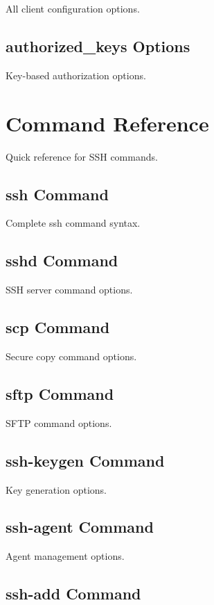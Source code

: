 \documentclass[12pt]{book}
\begin{document}
All client configuration options.

\subsection{authorized_keys Options}

Key-based authorization options.

\section{Command Reference}

Quick reference for SSH commands.

\subsection{ssh Command}

Complete ssh command syntax.

\subsection{sshd Command}

SSH server command options.

\subsection{scp Command}

Secure copy command options.

\subsection{sftp Command}

SFTP command options.

\subsection{ssh-keygen Command}

Key generation options.

\subsection{ssh-agent Command}

Agent management options.

\subsection{ssh-add Command}
\end{document}
